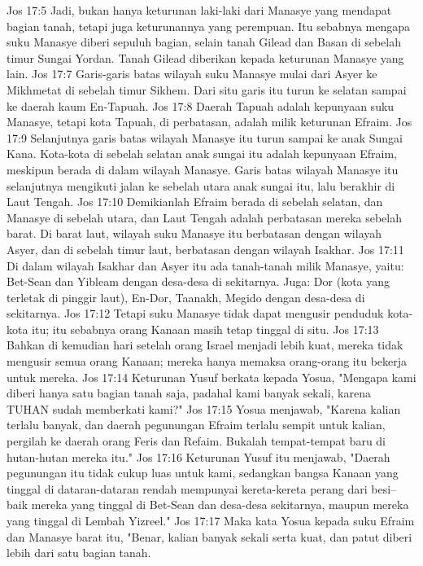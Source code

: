 Jos 17:5  Jadi, bukan hanya keturunan laki-laki dari Manasye yang mendapat bagian tanah, tetapi juga keturunannya yang perempuan. Itu sebabnya mengapa suku Manasye diberi sepuluh bagian, selain tanah Gilead dan Basan di sebelah timur Sungai Yordan. Tanah Gilead diberikan kepada keturunan Manasye yang lain.
Jos 17:7  Garis-garis batas wilayah suku Manasye mulai dari Asyer ke Mikhmetat di sebelah timur Sikhem. Dari situ garis itu turun ke selatan sampai ke daerah kaum En-Tapuah.
Jos 17:8  Daerah Tapuah adalah kepunyaan suku Manasye, tetapi kota Tapuah, di perbatasan, adalah milik keturunan Efraim.
Jos 17:9  Selanjutnya garis batas wilayah Manasye itu turun sampai ke anak Sungai Kana. Kota-kota di sebelah selatan anak sungai itu adalah kepunyaan Efraim, meskipun berada di dalam wilayah Manasye. Garis batas wilayah Manasye itu selanjutnya mengikuti jalan ke sebelah utara anak sungai itu, lalu berakhir di Laut Tengah.
Jos 17:10  Demikianlah Efraim berada di sebelah selatan, dan Manasye di sebelah utara, dan Laut Tengah adalah perbatasan mereka sebelah barat. Di barat laut, wilayah suku Manasye itu berbatasan dengan wilayah Asyer, dan di sebelah timur laut, berbatasan dengan wilayah Isakhar.
Jos 17:11  Di dalam wilayah Isakhar dan Asyer itu ada tanah-tanah milik Manasye, yaitu: Bet-Sean dan Yibleam dengan desa-desa di sekitarnya. Juga: Dor (kota yang terletak di pinggir laut), En-Dor, Taanakh, Megido dengan desa-desa di sekitarnya.
Jos 17:12  Tetapi suku Manasye tidak dapat mengusir penduduk kota-kota itu; itu sebabnya orang Kanaan masih tetap tinggal di situ.
Jos 17:13  Bahkan di kemudian hari setelah orang Israel menjadi lebih kuat, mereka tidak mengusir semua orang Kanaan; mereka hanya memaksa orang-orang itu bekerja untuk mereka.
Jos 17:14  Keturunan Yusuf berkata kepada Yosua, "Mengapa kami diberi hanya satu bagian tanah saja, padahal kami banyak sekali, karena TUHAN sudah memberkati kami?"
Jos 17:15  Yosua menjawab, "Karena kalian terlalu banyak, dan daerah pegunungan Efraim terlalu sempit untuk kalian, pergilah ke daerah orang Feris dan Refaim. Bukalah tempat-tempat baru di hutan-hutan mereka itu."
Jos 17:16  Keturunan Yusuf itu menjawab, "Daerah pegunungan itu tidak cukup luas untuk kami, sedangkan bangsa Kanaan yang tinggal di dataran-dataran rendah mempunyai kereta-kereta perang dari besi--baik mereka yang tinggal di Bet-Sean dan desa-desa sekitarnya, maupun mereka yang tinggal di Lembah Yizreel."
Jos 17:17  Maka kata Yosua kepada suku Efraim dan Manasye barat itu, "Benar, kalian banyak sekali serta kuat, dan patut diberi lebih dari satu bagian tanah.
